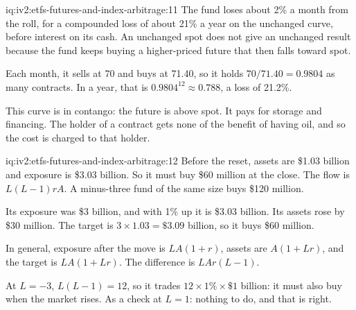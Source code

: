 \begin{solution}{iq:iv2:etfs-futures-and-index-arbitrage:11}
The fund loses about 2\% a month from the roll, for a compounded loss of about 21\% a year on the unchanged curve, before interest on its cash. An unchanged spot does not give an unchanged result because the fund keeps buying a higher-priced future that then falls toward spot.

Each month, it sells at 70 and buys at 71.40, so it holds $70/71.40 = 0.9804$ as many contracts. In a year, that is $0.9804^{12} \approx 0.788$, a loss of 21.2\%.

This curve is in contango: the future is above spot. It pays for storage and financing. The holder of a contract gets none of the benefit of having oil, and so the cost is charged to that holder.

\end{solution}

\begin{solution}{iq:iv2:etfs-futures-and-index-arbitrage:12}
Before the reset, assets are \$1.03 billion and exposure is \$3.03 billion. So it must buy \$60 million at the close. The flow is $L(L - 1)rA$. A minus-three fund of the same size buys \$120 million.

Its exposure was \$3 billion, and with 1\% up it is \$3.03 billion. Its assets rose by \$30 million. The target is $3 \times 1.03 = \$3.09$ billion, so it buys \$60 million.

In general, exposure after the move is $LA(1 + r)$, assets are $A(1 + Lr)$, and the target is $LA(1 + Lr)$. The difference is $LAr(L - 1)$.

At $L = -3$, $L(L - 1) = 12$, so it trades $12 \times 1\% \times \$1$ billion: it must also buy when the market rises. As a check at $L = 1$: nothing to do, and that is right.

\end{solution}

